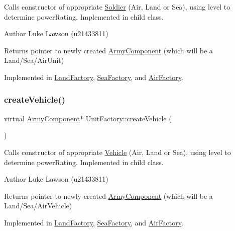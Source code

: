Calls constructor of appropriate \mbox{\hyperlink{class_soldier}{Soldier}} (Air, Land or Sea), using level to determine power\+Rating. Implemented in child class. 

\begin{DoxyAuthor}{Author}
Luke Lawson (u21433811) 
\end{DoxyAuthor}
\begin{DoxyReturn}{Returns}
pointer to newly created \mbox{\hyperlink{class_army_component}{Army\+Component}} (which will be a Land/\+Sea/\+Air\+Unit) 
\end{DoxyReturn}


Implemented in \mbox{\hyperlink{class_land_factory_a4a5150ab9c2a8b50922c9dbf39bd7214}{Land\+Factory}}, \mbox{\hyperlink{class_sea_factory_a29dad98d0d7b89028bd34814219b7b49}{Sea\+Factory}}, and \mbox{\hyperlink{class_air_factory_a1a83eb38a4fd955b2f65064d508b9dda}{Air\+Factory}}.

\mbox{\label{class_unit_factory_a465dd9ec1883939eb27274164e967822}} 
\subsubsection{\texorpdfstring{createVehicle()}{createVehicle()}}
{\footnotesize\ttfamily virtual \mbox{\hyperlink{class_army_component}{Army\+Component}}$\ast$ Unit\+Factory\+::create\+Vehicle (\begin{DoxyParamCaption}{ }\end{DoxyParamCaption})\hspace{0.3cm}{\ttfamily [pure virtual]}}



Calls constructor of appropriate \mbox{\hyperlink{class_vehicle}{Vehicle}} (Air, Land or Sea), using level to determine power\+Rating. Implemented in child class. 

\begin{DoxyAuthor}{Author}
Luke Lawson (u21433811) 
\end{DoxyAuthor}
\begin{DoxyReturn}{Returns}
pointer to newly created \mbox{\hyperlink{class_army_component}{Army\+Component}} (which will be a Land/\+Sea/\+Air\+Vehicle) 
\end{DoxyReturn}


Implemented in \mbox{\hyperlink{class_land_factory_a6f1a99f8b975ca829a188f862060fdcf}{Land\+Factory}}, \mbox{\hyperlink{class_sea_factory_a0914bdb14680e6b0c8292ba6f6d13b54}{Sea\+Factory}}, and \mbox{\hyperlink{class_air_factory_aede47fe0f3be3714ccef1faed3354d00}{Air\+Factory}}.

